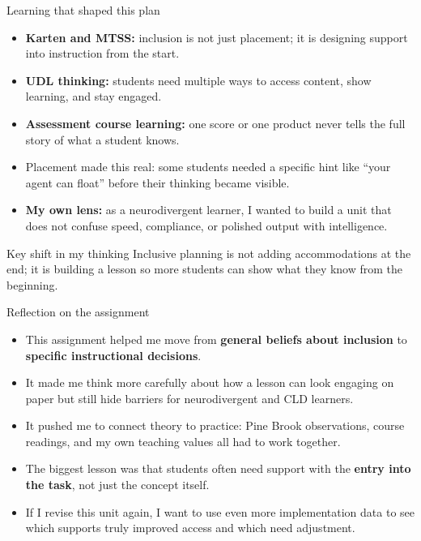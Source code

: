 \documentclass[aspectratio=169,11pt]{beamer}
\begin{document}
\begin{frame}{Learning that shaped this plan}
\begin{itemize}
  \item \textbf{Karten and MTSS:} inclusion is not just placement; it is designing support into instruction from the start.
  \item \textbf{UDL thinking:} students need multiple ways to access content, show learning, and stay engaged.
  \item \textbf{Assessment course learning:} one score or one product never tells the full story of what a student knows.
  \item Placement made this real: some students needed a specific hint like ``your agent can float'' before their thinking became visible.
  \item \textbf{My own lens:} as a neurodivergent learner, I wanted to build a unit that does not confuse speed, compliance, or polished output with intelligence.
\end{itemize}

\begin{block}{Key shift in my thinking}
Inclusive planning is not adding accommodations at the end; it is building a lesson so more students can show what they know from the beginning.
\end{block}
\end{frame}

\begin{frame}{Reflection on the assignment}
\begin{itemize}
  \item This assignment helped me move from \textbf{general beliefs about inclusion} to \textbf{specific instructional decisions}.
  \item It made me think more carefully about how a lesson can look engaging on paper but still hide barriers for neurodivergent and CLD learners.
  \item It pushed me to connect theory to practice: Pine Brook observations, course readings, and my own teaching values all had to work together.
  \item The biggest lesson was that students often need support with the \textbf{entry into the task}, not just the concept itself.
  \item If I revise this unit again, I want to use even more implementation data to see which supports truly improved access and which need adjustment.
\end{itemize}
\end{frame}
\end{document}

